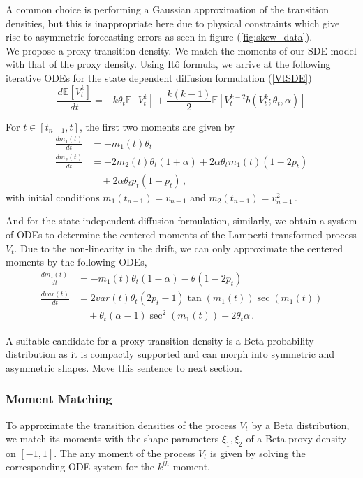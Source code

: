 \documentclass[11pt]{article}
\theoremstyle{definition}
\begin{document}
A common choice is performing a Gaussian approximation of the transition densities, but this is inappropriate here due to physical constraints which give rise to asymmetric forecasting errors as seen in figure (\ref{fig:skew_data}).\\

We propose a proxy transition density. We match the moments of our SDE model with that of the proxy density. Using It\^o formula, we arrive at the following iterative ODEs for the state dependent diffusion formulation (\ref{VtSDE})
\begin{equation}
\frac{d \mathbb{E}[ V^k_t]}{dt} = - k \theta_t \mathbb{E}[ V^k_t] + \frac{k(k-1)}{2} \mathbb{E}[ V^{k-2}_t  b(V^k_t;\theta_t, \alpha)]
\end{equation}

For $t\in [t_{n-1}, t]$, the first two moments are given by
\begin{align}
\frac{d m_1 (t)}{dt} &= - m_1(t)\theta_t   \nonumber \\
\frac{d m_2 (t)}{dt} &=  -2 m_2(t)\theta_t(1+\alpha) + 2\alpha\theta_t m_1(t)(1-2p_t)  \nonumber \\
&\quad + 2 \alpha\theta_t p_t (1-p_t) \,,
\end{align}
with initial conditions $m_1(t_{n-1})= v_{n-1}$ and $m_2(t_{n-1})= v_{n-1}^2 \,.$

And for the state independent diffusion formulation, similarly, we  obtain a system of ODEs to determine the centered moments of the Lamperti transformed process $V_t$. Due to the non-linearity in the drift, we can only approximate the centered moments by the following ODEs,
\begin{align}
\frac{d m_1 (t)}{dt} &= - m_1(t)\theta_t (1-\alpha) - \theta (1-2 p_t) \nonumber \\
\frac{d var(t)}{dt} &=  2 var(t) \theta_t (2p_t - 1 ) \tan(m_1 (t)) \sec(m_1 (t))   \nonumber \\
& \quad + \theta_t (\alpha - 1) \sec^2(m_1 (t))  + 2 \theta_t \alpha \,.
\end{align}

A suitable candidate for a proxy transition density is a Beta probability distribution as it is compactly supported and can morph into symmetric and asymmetric shapes. {\color{red} Move this sentence to next section.}

\subsubsection*{ Moment Matching}
To approximate the transition densities of  the process $V_t$ by a Beta distribution, we match its moments with the shape parameters $\xi_1, \xi_2$ of a Beta proxy density on $[-1,1]$. The any moment of the process $V_t$ is  given by solving the corresponding ODE system  for the $k^{th}$  moment,
\end{document}
